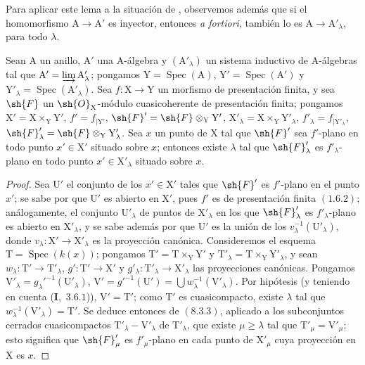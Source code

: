 
Para aplicar este lema a la situación de , observemos además
que si el homomorfismo $\mathrm{A}\to\mathrm{A}'$ es inyector, entonces
\emph{a fortiori}, también lo es $\mathrm{A}\to\mathrm{A}'_\lambda$, para todo
$\lambda$.

\begin{lemma}[11.5.5.2]
\label{IV.11.5.5.2}
Sean $\mathrm{A}$ un anillo, $\mathrm{A}'$ una $\mathrm{A}$-álgebra y $(\mathrm{A}'_\lambda)$ un sistema inductivo
de $\mathrm{A}$-álgebras tal que $\mathrm{A}'=\varinjlim\mathrm{A}'_\lambda$; pongamos $\mathrm{Y}=\operatorname{Spec}(\mathrm{A})$, $\mathrm{Y}'=\operatorname{Spec}(\mathrm{A}')$ y $\mathrm{Y}'_\lambda=\operatorname{Spec}(\mathrm{A}'_\lambda)$.
Sea $f:\mathrm{X}\to\mathrm{Y}$ un morfismo de presentación finita, y sea $\sh{F}$ un $\sh{O}_\mathrm{X}$-módulo cuasicoherente de
presentación finita; pongamos $\mathrm{X}'=\mathrm{X}\times_\mathrm{Y}\mathrm{Y}'$, $f'=f_{|\mathrm{Y}'}$, $\sh{F}'=\sh{F}\otimes_\mathrm{Y}\mathrm{Y}'$, $\mathrm{X}'_\lambda=\mathrm{X}\times_\mathrm{Y}\mathrm{Y}'_\lambda$, $f'_\lambda=f_{|\mathrm{Y}'_\lambda}$,
$\sh{F}'_\lambda=\sh{F}\otimes_\mathrm{Y}\mathrm{Y}'_\lambda$. Sea $x$ un punto de $\mathrm{X}$ tal que $\sh{F}'$ sea $f'$-plano en todo punto $x'\in\mathrm{X}'$ situado sobre $x$;
entonces existe $\lambda$ tal que $\sh{F}'_\lambda$ es $f'_\lambda$-plano en todo punto $x'\in\mathrm{X}'_\lambda$ situado sobre $x$.
\end{lemma}

\begin{proof}
Sea $\mathrm{U}'$ el conjunto de los $x'\in\mathrm{X}'$ tales que $\sh{F}'$ es $f'$-plano en el punto $x'$; se sabe por 
que $\mathrm{U}'$ es abierto en $\mathrm{X}'$, pues $f'$ es de presentación finita $(1.6.2)$; análogamente, el
conjunto $\mathrm{U}'_\lambda$ de puntos de $\mathrm{X}'_\lambda$ en los que $\sh{F}'_\lambda$ es $f'_\lambda$-plano es abierto en $\mathrm{X}'_\lambda$, y se sabe además por
 que $\mathrm{U}'$ es la unión de los $v_\lambda^{-1}(\mathrm{U}'_\lambda)$, donde $v_\lambda:\mathrm{X}'\to\mathrm{X}'_\lambda$ es la proyección canónica.
Consideremos el esquema $\mathrm{T}=\operatorname{Spec}(k(x))$; pongamos $\mathrm{T}'=\mathrm{T}\times_\mathrm{Y}\mathrm{Y}'$ y $\mathrm{T}'_\lambda=\mathrm{T}\times_\mathrm{Y}\mathrm{Y}'_\lambda$, y sean
$w_\lambda:\mathrm{T}'\to\mathrm{T}'_\lambda$, $g':\mathrm{T}'\to\mathrm{X}'$ y $g'_\lambda:\mathrm{T}'_\lambda\to\mathrm{X}'_\lambda$ las proyecciones canónicas. Pongamos $\mathrm{V}'_\lambda=g_\lambda'^{-1}(\mathrm{U}'_\lambda)$,
$\mathrm{V}'=g'^{-1}(\mathrm{U}')=\bigcup w_\lambda^{-1}(\mathrm{V}'_\lambda)$. Por hipótesis (y teniendo en cuenta (\textbf{I},~$3.6.1$)), $\mathrm{V}'=\mathrm{T}'$;
como $\mathrm{T}'$ es cuasicompacto, existe $\lambda$ tal que $w_\lambda^{-1}(\mathrm{V}'_\lambda)=\mathrm{T}'$. Se deduce entonces de $(8.3.3)$,
aplicado a los subconjuntos cerrados cuasicompactos $\mathrm{T}'_\lambda-\mathrm{V}'_\lambda$ de $\mathrm{T}'_\lambda$, que existe $\mu\geq\lambda$ tal
que $\mathrm{T}'_\mu=\mathrm{V}'_\mu$; esto significa que $\sh{F}'_\mu$ es $f'_\mu$-plano en cada punto de $\mathrm{X}'_\mu$ cuya proyección
en $\mathrm{X}$ es $x$.
\end{proof}

